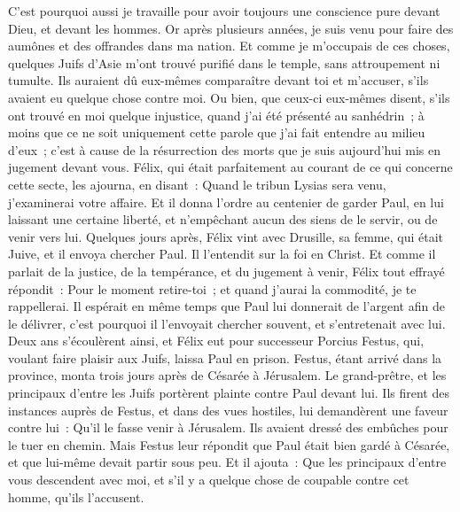 \begin{multicols}{2}
C'est pourquoi aussi je travaille pour avoir toujours une conscience pure devant Dieu, et devant les hommes.
Or après plusieurs années, je suis venu pour faire des aumônes et des offrandes dans ma nation.
Et comme je m'occupais de ces choses, quelques Juifs d'Asie m'ont trouvé purifié dans le temple, sans attroupement ni tumulte.
Ils auraient dû eux-mêmes comparaître devant toi et m'accuser, s'ils avaient eu quelque chose contre moi.
Ou bien, que ceux-ci eux-mêmes disent, s'ils ont trouvé en moi quelque injustice, quand j'ai été présenté au sanhédrin~;
à moins que ce ne soit uniquement cette parole que j'ai fait entendre au milieu d'eux~; c'est à cause de la résurrection des morts que je suis aujourd'hui mis en jugement devant vous.
Félix, qui était parfaitement au courant de ce qui concerne cette secte, les ajourna, en disant~: Quand le tribun Lysias sera venu, j'examinerai votre affaire.
Et il donna l'ordre au centenier de garder Paul, en lui laissant une certaine liberté, et n'empêchant aucun des siens de le servir, ou de venir vers lui.
Quelques jours après, Félix vint avec Drusille, sa femme, qui était Juive, et il envoya chercher Paul. Il l'entendit sur la foi en Christ.
Et comme il parlait de la justice, de la tempérance, et du jugement à venir, Félix tout effrayé répondit~: Pour le moment retire-toi~; et quand j'aurai la commodité, je te rappellerai.
Il espérait en même temps que Paul lui donnerait de l'argent afin de le délivrer, c'est pourquoi il l'envoyait chercher souvent, et s'entretenait avec lui.
Deux ans s'écoulèrent ainsi, et Félix eut pour successeur Porcius Festus, qui, voulant faire plaisir aux Juifs, laissa Paul en prison.
\VerseOne{}Festus, étant arrivé dans la province, monta trois jours après de Césarée à Jérusalem.
Le grand-prêtre, et les principaux d'entre les Juifs portèrent plainte contre Paul devant lui. Ils firent des instances auprès de Festus, et dans des vues hostiles,
lui demandèrent une faveur contre lui~: Qu'il le fasse venir à Jérusalem. Ils avaient dressé des embûches pour le tuer en chemin.
Mais Festus leur répondit que Paul était bien gardé à Césarée, et que lui-même devait partir sous peu.
Et il ajouta~: Que les principaux d'entre vous descendent avec moi, et s'il y a quelque chose de coupable contre cet homme, qu'ils l'accusent.

\end{multicols}
